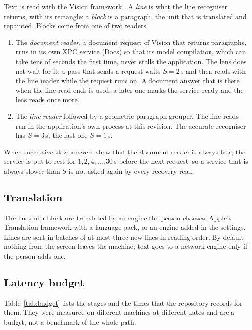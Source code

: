 Text is read with the Vision framework \citep{visiondoc}. A \emph{line} is what the line recogniser returns, with its
rectangle; a \emph{block} is a paragraph, the unit that is translated and repainted. Blocks come from one of two readers.
\begin{enumerate}
\item The \emph{document reader}, a document request of Vision that returns paragraphs, runs in its own XPC service (Docs) so
  that its model compilation, which can take tens of seconds the first time, never stalls the application. The lens does not
  wait for it: a pass that sends a request waits $S=2$\,s and then reads with the line reader while the request runs on.
  A document answer that is there when the line read ends is used; a later one marks the service ready and the lens reads
  once more.
\item The \emph{line reader} followed by a geometric paragraph grouper. The line reads run in the application's own process at
  this revision. The accurate recogniser has $S=3$\,s, the fast one $S=1$\,s.
\end{enumerate}
When successive slow answers show that the document reader is always late, the service is put to rest for $1,2,4,\dots,30$\,s
before the next request, so a service that is always slower than $S$ is not asked again by every recovery read.

\subsection{Translation}

The lines of a block are translated by an engine the person chooses: Apple's Translation framework \citep{transdoc} with a
language pack, or an engine added in the settings. Lines are sent in batches of at most three new lines in reading order.
By default nothing from the screen leaves the machine; text goes to a network engine only if the person adds one.

\subsection{Latency budget}

Table~\ref{tab:budget} lists the stages and the times that the repository records for them. They were measured on different
machines at different dates and are a budget, not a benchmark of the whole path.

